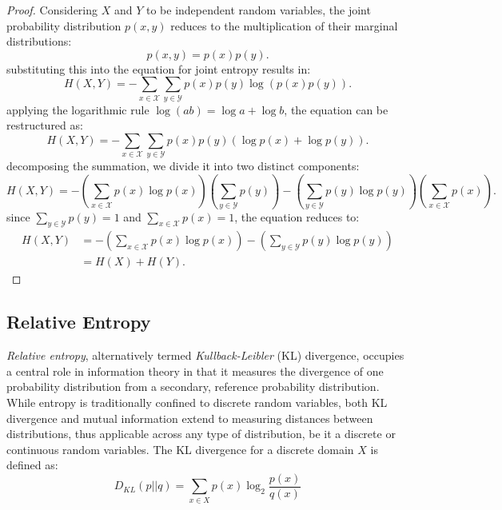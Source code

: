 \documentclass[12pt]{article}
\begin{document}
		\begin{proof}
			Considering \(X\) and \(Y\) to be independent random variables, the joint probability distribution \(p(x, y)\) reduces to the multiplication of their marginal distributions:
			\begin{equation}
				p(x, y) = p(x)p(y).
			\end{equation}
			substituting this into the equation for joint entropy results in:
			\begin{equation}
				H(X, Y) = -\sum_{x \in \mathcal{X}} \sum_{y \in \mathcal{Y}} p(x)p(y) \log (p(x)p(y)).
			\end{equation}
		    applying the logarithmic rule \(\log(ab) = \log a + \log b\), the equation can be restructured as:
			\begin{equation}
				H(X, Y) = -\sum_{x \in \mathcal{X}} \sum_{y \in \mathcal{Y}} p(x)p(y) (\log p(x) + \log p(y)).
			\end{equation}
			decomposing the summation, we divide it into two distinct components:
			\begin{equation}
				H(X, Y) = -\left(\sum_{x \in \mathcal{X}} p(x) \log p(x)\right) \left(\sum_{y \in \mathcal{Y}} p(y)\right) - \left(\sum_{y \in \mathcal{Y}} p(y) \log p(y)\right) \left(\sum_{x \in \mathcal{X}} p(x)\right).
			\end{equation}
			since \(\sum_{y \in \mathcal{Y}} p(y) = 1\) and \(\sum_{x \in \mathcal{X}} p(x) = 1\), the equation reduces to:
			\begin{equation}
				\begin{split}
					H(X, Y) & =  -\left(\sum_{x \in \mathcal{X}} p(x) \log p(x)\right) - \left(\sum_{y \in \mathcal{Y}} p(y) \log p(y)\right) \\
					& = H(X) + H(Y). 
				\end{split}
			\end{equation}
		\end{proof}
		
		
		
		\subsection{Relative Entropy}
		\emph{Relative entropy}, alternatively termed \emph{Kullback-Leibler} (KL) divergence, occupies a central role in information theory in that it measures the divergence of one probability distribution from a secondary, reference probability distribution. While entropy is traditionally confined to discrete random variables, both KL divergence and mutual information extend to measuring distances between distributions, thus applicable across any type of distribution, be it a discrete or continuous random variables. The KL divergence for a discrete domain \(X\) is defined as:
		\[ D_{KL}(p||q) = \sum_{x \in X} p(x) \log_2 \frac{p(x)}{q(x)} \]
		
\end{document}

